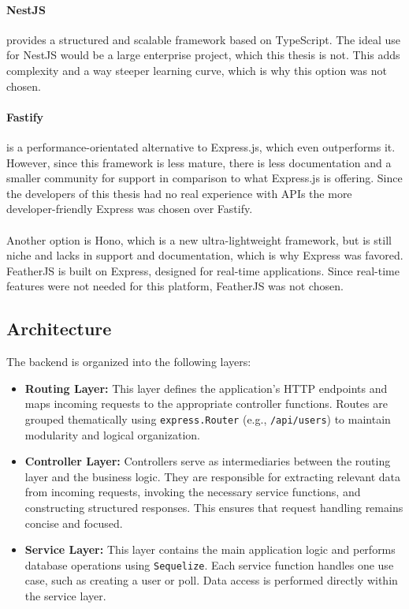 \documentclass[a4paper,12pt]{report}
\begin{document}
\paragraph{NestJS} provides a structured and scalable framework based on TypeScript. The ideal use for NestJS would be a large enterprise project, which this thesis is not. This adds complexity and a way steeper learning curve, which is why this option was not chosen. \cite{expr-comp}\cite{expr-comp2}\cite{nest-js}
\paragraph{Fastify} is a performance-orientated alternative to Express.js, which even outperforms it. However, since this framework is less mature, there is less documentation and a smaller community for support in comparison to what Express.js is offering. Since the developers of this thesis had no real experience with APIs the more developer-friendly Express was chosen over Fastify. \cite{expr-comp} \cite{expr-comp2} \\ \\
Another option is Hono, which is a new ultra-lightweight framework, but is still niche and lacks in support and documentation, which is why Express was favored. FeatherJS is built on Express, designed for real-time applications. Since real-time features were not needed for this platform, FeatherJS was not chosen. \cite{expr-comp} \cite{expr-comp2}
\subsection{Architecture}
The backend is organized into the following layers:
\begin{itemize}
	\item \textbf{Routing Layer:} This layer defines the application's HTTP endpoints and maps incoming requests to the appropriate controller functions. Routes are grouped thematically using \verb|express.Router| (e.g., \verb|/api/users|) to maintain modularity and logical organization.
	
	\item \textbf{Controller Layer:} Controllers serve as intermediaries between the routing layer and the business logic. They are responsible for extracting relevant data from incoming requests, invoking the necessary service functions, and constructing structured responses. This ensures that request handling remains concise and focused.
	
	\item \textbf{Service Layer:} This layer contains the main application logic and performs database operations using \texttt{Sequelize}. Each service function handles one use case, such as creating a user or poll. Data access is performed directly within the service layer.
\end{itemize}
\end{document}
